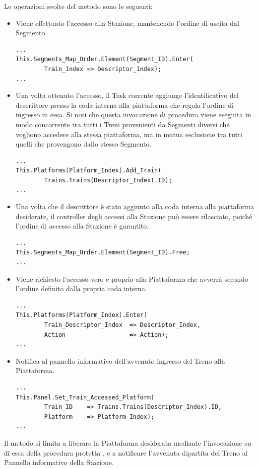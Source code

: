 	Le operazioni svolte del metodo  sono le seguenti:
	\begin{itemize}
	
		\item Viene effettuato l'accesso alla Stazione, mantenendo l'ordine di uscita dal Segmento.

\begin{lstlisting}
...
This.Segments_Map_Order.Element(Segment_ID).Enter(
		Train_Index	=> Descriptor_Index);
...
\end{lstlisting}
		\item Una volta ottenuto l'accesso, il Task corrente aggiunge l'identificativo del descrittore presso la coda interna alla piattaforma che regola l'ordine di ingresso in essa.
		Si noti che questa invocazione di procedura viene eseguita in modo concorrente tra tutti i Treni provenienti da Segmenti diversi che vogliono accedere alla stessa piattaforma, ma in mutua esclusione tra tutti quelli che provengono dallo stesso Segmento.
\begin{lstlisting}
...
This.Platforms(Platform_Index).Add_Train(
		Trains.Trains(Descriptor_Index).ID);
...
\end{lstlisting}
		\item Una volta che il descrittore è stato aggiunto alla coda interna alla piattaforma desiderate, il controller degli accessi alla Stazione può essere rilasciato, poiché l'ordine di accesso alla Stazione è garantito.
\begin{lstlisting}
...
This.Segments_Map_Order.Element(Segment_ID).Free;
...
\end{lstlisting}
		\item Viene richiesto l'accesso vero e proprio alla Piattaforma che avverrà secondo l'ordine definito dalla propria coda interna.
\begin{lstlisting}
...
This.Platforms(Platform_Index).Enter(
		Train_Descriptor_Index 	=> Descriptor_Index,
		Action					=> Action);
...
\end{lstlisting}
		\item Notifica al pannello informativo dell'avvenuto ingresso del Treno alla Piattaforma.
\begin{lstlisting}
...
This.Panel.Set_Train_Accessed_Platform(
		Train_ID	=> Trains.Trains(Descriptor_Index).ID,
		Platform 	=> Platform_Index);
...
\end{lstlisting}
	\end{itemize}
	
	Il metodo  si limita a liberare la Piattaforma desiderata mediante l'invocazione su di essa della procedura protetta , e a notificare l'avvenuta dipartita del Treno al Pannello informativo della Stazione.
	
